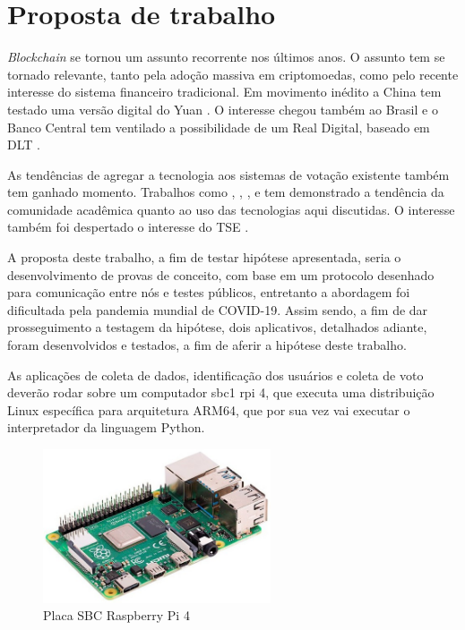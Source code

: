 \chapter{Proposta de trabalho}

\textit{Blockchain} se tornou um assunto recorrente nos últimos anos. O assunto tem se tornado relevante, tanto pela adoção massiva em criptomoedas, como pelo recente interesse do sistema financeiro tradicional. Em movimento inédito a China tem testado uma versão digital do Yuan \cite{Carvalho2020}. O interesse chegou também ao Brasil e o Banco Central tem ventilado a possibilidade de um Real Digital, baseado em DLT \cite{Tecmundo2021}.

As tendências de agregar a tecnologia aos sistemas de votação existente também tem ganhado momento. Trabalhos como , , ,  e  tem demonstrado a tendência da comunidade acadêmica quanto ao uso das tecnologias aqui discutidas. O interesse também foi despertado o interesse do TSE \cite{GUSSON}. 

A proposta deste trabalho, a fim de testar hipótese apresentada, seria o desenvolvimento de provas de conceito, com base em um protocolo desenhado para comunicação entre nós e testes públicos, entretanto a abordagem foi dificultada pela pandemia mundial de COVID-19. Assim sendo, a fim de dar prosseguimento a testagem da hipótese, dois aplicativos, detalhados adiante, foram desenvolvidos e testados, a fim de aferir a hipótese deste trabalho. 

As aplicações de coleta de dados, identificação dos usuários e coleta de voto deverão rodar sobre um computador \gls{sbc1} \gls{rpi} 4, que executa uma distribuição Linux específica para arquitetura ARM64, que por sua vez vai executar o interpretador da linguagem Python. 

\begin{figure}[h!]
	\centering
	\includegraphics[width=0.6\textwidth]{imagens/rpi4}
	\caption{Placa SBC Raspberry Pi 4}
	\label{fig:rpi4}
\end{figure}
